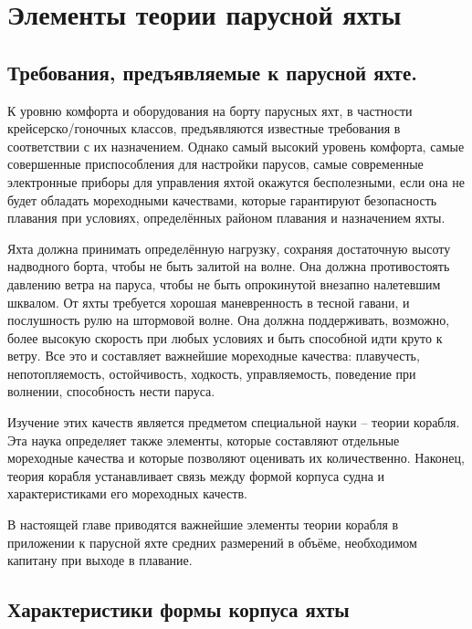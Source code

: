 \twocolumn

\chapter{Элементы теории парусной яхты}

\section{Требования, предъявляемые к парусной яхте.}

К уровню комфорта и оборудования на борту парусных яхт, в частности
крейсерско\-/гоночных классов, предъявляются известные требования в
соответствии с их назначением. Однако самый высокий уровень комфорта,
самые совершенные приспособления для настройки парусов, самые
современные электронные приборы для управления яхтой окажутся
бесполезными, если она не будет обладать мореходными качествами,
которые гарантируют безопасность плавания при условиях, определённых
районом плавания и назначением яхты.

Яхта должна принимать определённую нагрузку, сохраняя достаточную
высоту надводного борта, чтобы не быть
залитой на волне. Она должна противостоять давлению ветра на паруса,
чтобы не быть опрокинутой внезапно налетевшим
шквалом. От яхты требуется хорошая
маневренность в тесной гавани, и послушность рулю на штормовой
волне. Она должна поддерживать, возможно, более высокую скорость при
любых условиях и быть способной идти круто к ветру. Все это и
составляет важнейшие мореходные качества: плавучесть, непотопляемость,
остойчивость, ходкость, управляемость, поведение при волнении,
способность нести паруса.

Изучение этих качеств является предметом специальной науки \--- теории
корабля. Эта наука определяет также элементы, которые составляют
отдельные мореходные качества и которые позволяют оценивать их
количественно. Наконец, теория корабля устанавливает связь между
формой корпуса судна и характеристиками его мореходных качеств.

В настоящей главе приводятся важнейшие элементы теории корабля в
приложении к парусной яхте средних размерений в объёме, необходимом
капитану при выходе в плавание.

\section{Характеристики формы корпуса яхты}

